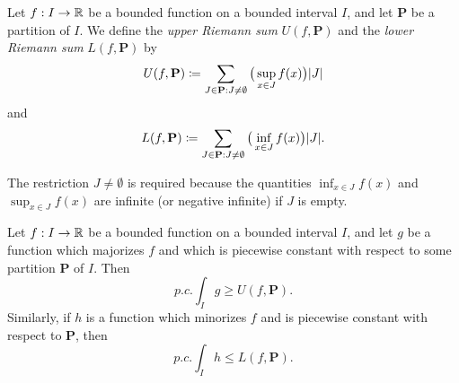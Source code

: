 \begin{defn}\label{11.3.9}
  Let \(f : I \to \mathbb{R}\) be a bounded function on a bounded interval \(I\), and let \(\mathbf{P}\) be a partition of \(I\).
  We define the \emph{upper Riemann sum} \(U(f, \mathbf{P})\) and the \emph{lower Riemann sum} \(L(f, \mathbf{P})\) by
  \[
    U(f, \mathbf{P}) \coloneqq \sum_{J \in \mathbf{P} : J \neq \emptyset} \big(\sup_{x \in J} f(x)\big) \abs{J}
  \]
  and
  \[
    L(f, \mathbf{P}) \coloneqq \sum_{J \in \mathbf{P} : J \neq \emptyset} \big(\inf_{x \in J} f(x)\big) \abs{J}.
  \]
\end{defn}

\begin{rmk}\label{11.3.10}
  The restriction \(J \neq \emptyset\) is required because the quantities \(\inf_{x \in J} f(x)\) and \(\sup_{x \in J} f(x)\) are infinite (or negative infinite) if \(J\) is empty.
\end{rmk}

\begin{lem}\label{11.3.11}
  Let \(f : I \to \mathbb{R}\) be a bounded function on a bounded interval \(I\), and let \(g\) be a function which majorizes \(f\) and which is piecewise constant with respect to some partition \(\mathbf{P}\) of \(I\).
  Then
  \[
    p.c. \int_I g \geq U(f, \mathbf{P}).
  \]
  Similarly, if \(h\) is a function which minorizes \(f\) and is piecewise constant with respect to \(\mathbf{P}\), then
  \[
    p.c. \int_I h \leq L(f, \mathbf{P}).
  \]
\end{lem}

